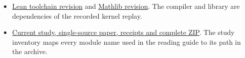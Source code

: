 \documentclass[12pt,letterpaper]{article}
\begin{document}
\begin{itemize}
\item \href{https://github.com/leanprover/lean4/commit/819816b2e0a3bf405af45ae5c7af2491d8f5bee6}{Lean toolchain revision} and \href{https://github.com/leanprover-community/mathlib4/commit/0df444a360eaa60ab8c11dca51a86af692955474}{Mathlib revision}. The compiler and library are dependencies of the recorded kernel replay.
\item \href{https://github.com/nousentllc/riemann-hypothesis/tree/experiments/uriel-ramified-square-dilates/research/uriel/experiments/ramified-square-dilates}{Current study, single-source paper, receipts and complete ZIP}. The study inventory maps every module name used in the reading guide to its path in the archive.
\end{itemize}
\end{document}
